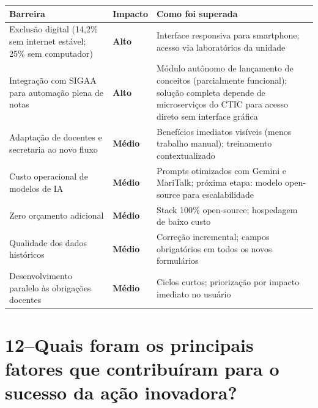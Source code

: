 \documentclass[12pt,a4paper]{article}
\begin{document}
\begin{center}
\renewcommand{\arraystretch}{1.0}
\begin{tabular}{L{4.6cm} C{1.6cm} L{5.8cm}}
\toprule
\textbf{Barreira} & \textbf{Impacto} & \textbf{Como foi superada} \\
\midrule
Exclusão digital (14,2\% sem internet estável; 25\% sem computador) &
  \textcolor{ufpared}{\textbf{Alto}} &
  Interface responsiva para smartphone; acesso via laboratórios da unidade \\
Integração com SIGAA para automação plena de notas &
  \textcolor{ufpared}{\textbf{Alto}} &
  Módulo autônomo de lançamento de conceitos (parcialmente funcional); solução completa depende de microserviços do CTIC para acesso direto sem interface gráfica \\
Adaptação de docentes e secretaria ao novo fluxo &
  \textcolor{accentor}{\textbf{Médio}} &
  Benefícios imediatos visíveis (menos trabalho manual); treinamento contextualizado \\
Custo operacional de modelos de IA &
  \textcolor{accentor}{\textbf{Médio}} &
  Prompts otimizados com Gemini e MariTalk; próxima etapa: modelo open-source para escalabilidade \\
Zero orçamento adicional &
  \textcolor{accentor}{\textbf{Médio}} &
  Stack 100\% open-source; hospedagem de baixo custo \\
Qualidade dos dados históricos &
  \textcolor{accentor}{\textbf{Médio}} &
  Correção incremental; campos obrigatórios em todos os novos formulários \\
Desenvolvimento paralelo às obrigações docentes &
  \textcolor{accentor}{\textbf{Médio}} &
  Ciclos curtos; priorização por impacto imediato no usuário \\
\bottomrule
\end{tabular}
\end{center}

\section{12\;–\;Quais foram os principais fatores que contribuíram para o sucesso da ação inovadora?}
\end{document}
